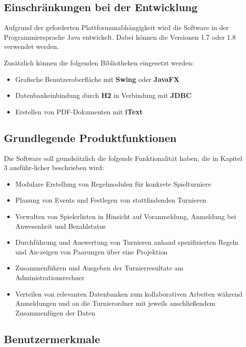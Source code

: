 \documentclass[11pt]{article}
\begin{document}
\subsection{Einschränkungen bei der Entwicklung}

Aufgrund der geforderten Plattformunabhängigkeit wird die Software in der Programmiersprache Java entwickelt. Dabei können die Versionen 1.7 oder 1.8 verwendet werden.

Zusätzlich können die folgenden Bibliotheken eingesetzt werden:
\begin{itemize}
	\item Grafische Benutzeroberfläche mit \textbf{Swing} oder \textbf{JavaFX}
	\item Datenbankeinbindung durch \textbf{H2} in Verbindung mit \textbf{JDBC}
	\item Erstellen von PDF-Dokumenten mit \textbf{iText}
\end{itemize}

\subsection{Grundlegende Produktfunktionen}

Die Software soll grundsätzlich die folgende Funktionalität haben, die in Kapitel 3 ausführ-licher beschrieben wird:
\begin{itemize}
	\item Modulare Erstellung von Regelmodulen für konkrete Spielturniere
	\item Planung von Events und Festlegen von stattfindenden Turnieren
	\item Verwalten von Spielerlisten in Hinsicht auf Voranmeldung, Anmeldung bei Anwesenheit und Bezahlstatus
	\item Durchführung und Auswertung von Turnieren anhand spezifizierten Regeln und An-zeigen von Paarungen über eine Projektion
	\item Zusammenführen und Ausgeben der Turnierresultate am Administrationsrechner
	\item Verteilen von relevanten Datenbanken zum kollaborativen Arbeiten während Anmeldungen und an die Turnierordner mit jeweils anschließendem Zusammenfügen der Daten
\end{itemize}

\newpage

\subsection{Benutzermerkmale}
\end{document}
